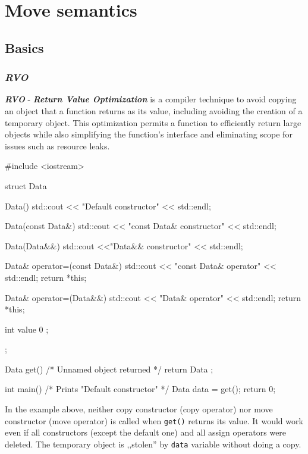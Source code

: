 \documentclass[../main]{subfiles}
\begin{document}
\chapter{Move semantics}
\section{Basics}
\subsection{\textit{RVO}}
    \textbf{\textit{RVO}} - \textbf{\textit{Return Value Optimization}} is a compiler technique to avoid copying an object that a function returns as its value, including
avoiding the creation of a temporary object. This optimization permits a function to efficiently return large objects while also simplifying the function’s
interface and eliminating scope for issues such as resource leaks.
\begin{Code}
    #include <iostream>
    
    struct Data
    {
        Data()
        {
            std::cout << "Default constructor" << std::endl;
        }
        
        Data(const Data&)
        {
            std::cout << "const Data& constructor" << std::endl;
        }
        
        Data(Data&&)
        {
            std::cout <<"Data&& constructor" << std::endl;
        }
        
        Data& operator=(const Data&)
        {
            std::cout << "const Data& operator" << std::endl;
            return *this;
        }
        
        Data& operator=(Data&&)
        {
            std::cout << "Data& operator" << std::endl;
            return *this;
        }

        int value { 0 };
    };
    
    Data get()
    {
        /* Unnamed object returned */
        return Data {};
    }
    
    int main()
    {
        /* Prints "Default constructor" */
        Data data = get();
        return 0;
    }
\end{Code}
\noindent
In the example above, neither copy constructor (copy operator) nor move constructor (move operator) is called when \texttt{get()} returns its value. It would work
even if all constructors (except the default one) and all assign operators were deleted. The temporary object is ,,stolen'' by \texttt{data} variable without
doing a copy.\newline
\end{document}
